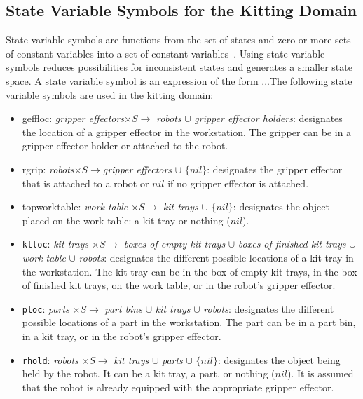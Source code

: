 \subsection{State Variable Symbols for the Kitting Domain}
State variable symbols are functions from the set of states and zero or more sets of constant variables into a set of constant variables~\cite{NAU.2004}. Using state variable symbols reduces possibilities for inconsistent states and generates a smaller state space. A state variable symbol is an expression of the form ...The following state variable symbols are used in the kitting domain:
\begin{itemize}
\item geffloc: \emph{gripper effectors}$\times S\rightarrow$ \emph{robots} $\cup$ \emph{gripper effector holders}: designates the location of a gripper effector in the workstation. The gripper can be in a gripper effector holder or attached to the robot.


\item rgrip: \emph{robots}$\times S\rightarrow$\emph{gripper effectors} $\cup$ $\lbrace nil\rbrace$: designates the gripper effector that is attached to a robot or $nil$ if no gripper effector is attached.

\item topworktable: \emph{work table} $\times S \rightarrow$ \emph{kit trays} $\cup$ $\lbrace nil\rbrace$: designates the object placed on the work table: a kit tray or nothing ($nil$).

\item \texttt{ktloc}: \emph{kit trays} $\times S \rightarrow$ \emph{boxes of empty kit trays} $\cup$ \emph{boxes of finished kit trays} $\cup$ \emph{work table} $\cup$ \emph{robots}: designates the different possible locations of a kit tray in the workstation. The kit tray can be in the box of empty kit trays, in the box of finished kit trays, on the work table, or in the robot's gripper effector.

\item \texttt{ploc}: \emph{parts} $\times S \rightarrow$ \emph{part bins} $\cup$ \emph{kit trays} $\cup$ \emph{robots}: designates the different possible locations of a part in the workstation. The part can be in a part bin, in a kit tray, or in the robot's gripper effector.

\item \texttt{rhold}: \textit{robots} $\times S \rightarrow$ \textit{kit trays} $\cup$ \textit{parts} $\cup$ $\lbrace nil\rbrace$: designates the object being held by the robot. It can be a kit tray, a part, or nothing ($nil$). It is assumed that the robot is already equipped with the appropriate gripper effector.


\end{itemize}
